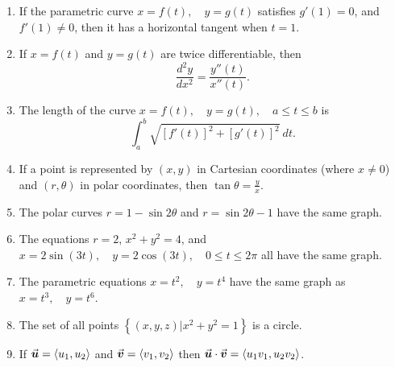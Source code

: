 \begin{enumerate}


\item  If the parametric curve \(x=f(t), \quad y=g(t)\) satisfies \(g'(1)=0\), and \(f'(1)\neq 0\), then it has a horizontal tangent when \(t=1\). \label{TFE1}%
\vfill

\item If \(x=f(t)\) and \(y=g(t)\) are twice differentiable, then 
\[
\frac{d^2y}{dx^2} = \frac{y''(t)}{x''(t)}.
\]  \label{TFE2}%
\vfill

\item The length of the curve \(x=f(t),\quad y=g(t), \quad a\leq t \leq b\) is 
\[
\int_a^b \sqrt{[f'(t)]^2+[g'(t)]^2}\ dt.
\] \label{TFE3}%
\vfill

\item If a point is represented by \((x,y)\) in Cartesian coordinates (where \(x\neq 0\)) and \((r,\theta)\) in polar coordinates, then \(\tan \theta = \frac{y}{x}\). \label{TFE4}%
\vfill

\item The polar curves \(r=1-\sin2\theta\) and \(r=\sin2\theta -1\) have the same graph. \label{TFE5}%
\vfill

\item The equations \(r=2\), \(x^2+y^2=4\), and \(x=2\sin(3t), \quad y=2\cos(3t), \quad 0\leq t\leq 2\pi\) all have the same graph. \label{TFE6}%
\vfill

\item The parametric equations \(x=t^2,\quad y=t^4\) have the same graph as \(x=t^3,\quad y=t^6\). \label{TFE7}%
\vfill


\item The set of all points \(\left\lbrace (x,y,z) | x^2+y^2=1\right\rbrace\) is a circle. \label{TFE10}%
\vfill


\item If \(\u=\<u_1, u_2\>\) and \(\v=\<v_1, v_2\>\) 
then \(\u \cdot \v = \<u_1 v_1, u_2 v_2\>\). \label{TFE8}%
\vfill





\end{enumerate}
